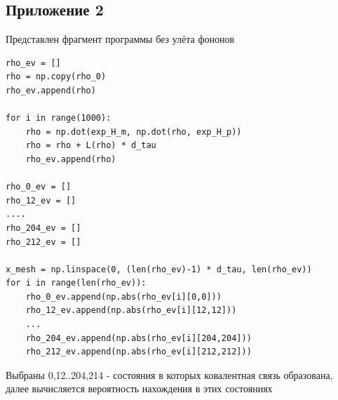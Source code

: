 \documentclass[12pt, a4paper]{article}
\begin{document}
\subsection{Приложение 2}
Представлен фрагмент программы без улёта фононов
\begin{lstlisting}
rho_ev = []
rho = np.copy(rho_0)
rho_ev.append(rho)

for i in range(1000):
    rho = np.dot(exp_H_m, np.dot(rho, exp_H_p))
    rho = rho + L(rho) * d_tau
    rho_ev.append(rho)

rho_0_ev = []
rho_12_ev = []
....
rho_204_ev = []
rho_212_ev = []

x_mesh = np.linspace(0, (len(rho_ev)-1) * d_tau, len(rho_ev))
for i in range(len(rho_ev)):
    rho_0_ev.append(np.abs(rho_ev[i][0,0]))
    rho_12_ev.append(np.abs(rho_ev[i][12,12]))
    ...
    rho_204_ev.append(np.abs(rho_ev[i][204,204]))
    rho_212_ev.append(np.abs(rho_ev[i][212,212]))
\end{lstlisting}
Выбраны 0,12..204,214 - состояния в которых ковалентная связь образована, далее вычисляется вероятность нахождения в этих состояниях
\end{document}
